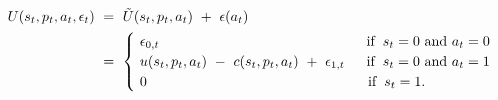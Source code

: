 \begin{equation}
\begin{split}
     U(s_{t}, p_{t}, a_{t}, \epsilon_{t}) \ 
     & = \ \tilde{U}(s_{t}, p_{t}, a_{t}) \ + \ \epsilon(a_{t}) \\
     & = \ 
     \begin{cases}
          \ \epsilon_{0,t} \hspace{5.2cm} \text{if} \hspace{0.2cm} s_{t} = 0 \text{ and } a_{t} = 0 \\
          \ u(s_{t}, p_{t}, a_{t}) \ - \ c(s_{t}, p_{t}, a_{t}) \ + \ \epsilon_{1,t} \hspace{0.55cm} \text{if} \hspace{0.2cm} s_{t} = 0 \text{ and } a_{t} = 1 \\ 
          \ 0 \hspace{5.55cm} \text{if} \hspace{0.2cm} s_{t} = 1.
     \end{cases}
\end{split}
\label{Equation:DCDP-Model_Utility-Function}
\end{equation}